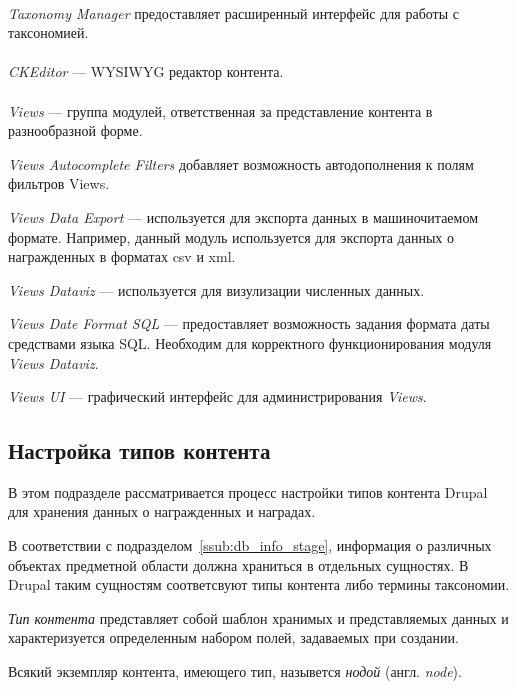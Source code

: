 \paragraph{}
\textit{Taxonomy Manager} предоставляет расширенный интерфейс для работы с таксономией.

\paragraph{}
\textit{CKEditor} --- WYSIWYG редактор контента.

\paragraph{}
\textit{Views} --- группа модулей, ответственная за представление контента
в разнообразной форме.

\textit{Views Autocomplete Filters} добавляет возможность автодополнения
к полям фильтров Views.

\textit{Views Data Export} --- используется для экспорта данных в машиночитаемом формате.
Например, данный модуль используется для экспорта данных о награжденных в форматах csv и xml.

\textit{Views Dataviz} --- используется для визулизации численных данных.

\textit{Views Date Format SQL} --- предоставляет возможность задания формата даты средствами
языка SQL. Необходим для корректного функционирования модуля \textit{Views Dataviz}.

\textit{Views UI} --- графический интерфейс для администрирования \textit{Views}.

\subsection{Настройка типов контента}
\label{ssec:content_types_setup}

В этом подразделе рассматривается процесс настройки типов контента Drupal для хранения
данных о награжденных и наградах.

В соответствии с подразделом~\ref{ssub:db_info_stage}, информация о различных 
объектах предметной области должна храниться в отдельных сущностях.
В Drupal таким сущностям соответсвуют типы контента либо термины таксономии.

\textit{Тип контента} представляет собой шаблон хранимых и представляемых данных и
характеризуется определенным набором полей, задаваемых при создании.

Всякий экземпляр контента, имеющего тип, назывется \textit{нодой} (англ. \textit{node}).

